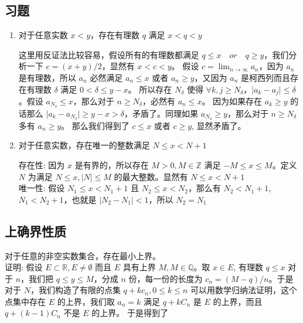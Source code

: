 \subsection{习题}

\begin{enumerate}
    \item 对于任意实数 $ x < y$，存在有理数 $q$ 满足 $x < q < y$

这里用反证法比较容易，假设所有的有理数都满足 $ q \le x \quad or \quad q \ge y $，我们分析一下 $c = (x+y)/2$，显然有 $x < c < y$。
假设 $ c = \lim_{n \to \infty}a_n$，因为 $a_n$ 是有理数，所以 $a_n$ 必然满足 $a_n \le x$ 或者 $a_n \ge y$，又因为 $a_n$ 是柯西列而且存在有理数 $\delta $ 满足 $0 < \delta \le y-x$。
所以存在 $N_{\delta}$ 使得 $\forall k,j \ge N_{\delta}$，$\lvert a_k - a_j \rvert \le \delta $。假设 $a_{N_{\delta}} \le x$，那么对于 $n \ge N_{\delta}$，必然有 $a_n \le x$。
因为如果存在 $a_k \ge y$ 的话那么 $\lvert a_k - a_{N_\delta} \rvert \ge y -x > \delta $，矛盾了。同理如果 $a_{N_{\delta}} \ge y$，那么对于 $n \ge N_{\delta}$ 多有 $a_n \ge y$。
那么我们得到了 $ c \le x$ 或者 $c \ge y$, 显然矛盾了。

    \item 对于任意实数，存在唯一的整数满足 $N \le x < N + 1$

存在性: 因为 $x$ 是有界的，所以存在 $M > 0, M \in \mathbb{Z}$ 满足 $ -M \le x \le M $。定义 $ N $ 为满足 $N \le x, \lvert N \rvert \le M$ 的最大整数。显然有 $ N \le x < N + 1 $\\

唯一性: 假设 $N_1 \le x < N_1 + 1$ 且 $N_2 \le x < N_2$，那么有 $N_2 < N_1 + 1$, $N_1 < N_2 + 1$，也就是 $\lvert N_2 - N_1 \rvert < 1$，所以 $N_2 = N_1$
\end{enumerate}






\subsection{上确界性质}

对于任意的非空实数集合，存在最小上界。\\

证明: 假设 $E \subset \mathbb{R}, E \ne \emptyset $ 而且 $ E $ 具有上界 $M, M \in \mathbb{Q}$。取 $x \in E$, 有理数 $q \le x$
对于 $n$，我们把 $q \le y \le M$，分成 $n$ 份，每一份的长度为 $c_n = (M -q) / n$。于是对于 $N$，我们构造了有限的点集 $q + kc_n, 0 \le k \le n $
可以用数学归纳法证明，这个点集中存在 $E$ 的上界，我们取 $a_n = k $ 满足 $q + kC_n$ 是 $E$ 的上界，而且 $q + (k-1)C_n $ 不是 $E$ 的上界。
于是得到了

